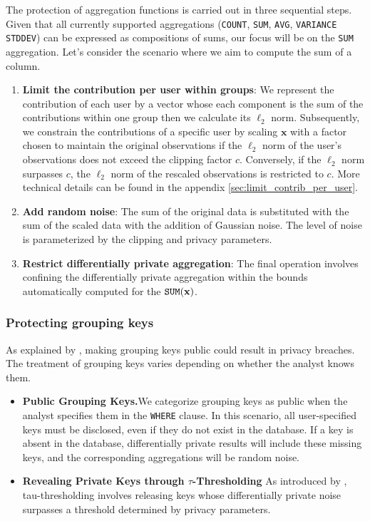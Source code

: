\documentclass[letterpaper]{article} %
\begin{document}
The protection of aggregation functions is carried out in three sequential steps. Given that all currently supported aggregations (\texttt{COUNT}, \texttt{SUM}, \texttt{AVG}, \texttt{VARIANCE} \texttt{STDDEV}) can be expressed as compositions of sums, our focus will be on the \texttt{SUM} aggregation. Let's consider the scenario where we aim to compute the sum of a column.

\begin{enumerate}
	\item \textbf{Limit the contribution per user within groups}:
	We represent the contribution of each user by a vector whose each component is the sum of the contributions within one group
    then we calculate its $\ell_2$ norm.
    Subsequently, we constrain the contributions of a specific user by scaling $\textbf{x}$ with a factor chosen to maintain the original observations if the $\ell_2$ norm of the user's observations does not exceed the clipping factor $c$.
    Conversely, if the $\ell_2$ norm surpasses $c$, the $\ell_2$  norm of the rescaled observations is restricted to $c$.
    More technical details can be found in the appendix \ref{sec:limit_contrib_per_user}.

	\item \textbf{Add random noise}:
	The sum of the original data is substituted with the sum of the scaled data with the addition of Gaussian noise. The level of noise is parameterized by the clipping and privacy parameters.

	\item \textbf{Restrict differentially private aggregation}:
	The final operation involves confining the differentially private aggregation within the bounds automatically computed for the $\text{\texttt{SUM}}(\textbf{x})$.
\end{enumerate}

\subsubsection{Protecting grouping keys}
As explained by \citeauthor{wilson2019differentially}, making grouping keys public could result in privacy breaches.
The treatment of grouping keys varies depending on whether the analyst knows them.

\begin{itemize}
	\item \textbf{Public Grouping Keys.}We categorize grouping keys as public when the analyst specifies them in the \texttt{WHERE} clause.
	In this scenario, all user-specified keys must be disclosed, even if they do not exist in the database.
	If a key is absent in the database, differentially private results will include these missing keys, and the corresponding aggregations will be random noise.
	\item \textbf{Revealing Private Keys through $\tau$-Thresholding}
	As introduced by \citeauthor{wilson2019differentially}, tau-thresholding involves releasing keys whose differentially private noise surpasses a threshold determined by privacy parameters.
\end{itemize}
\end{document}
